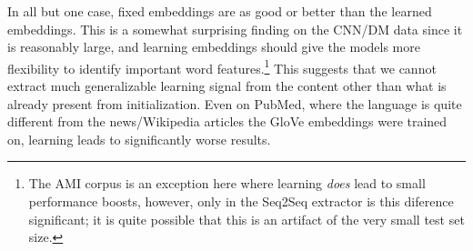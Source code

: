  In all but one case,
fixed embeddings are as good or better than the learned embeddings.
This is a somewhat surprising finding on the CNN/DM data since it is reasonably
large, and learning embeddings should give the models more
flexibility to identify important word features.\footnote{The AMI corpus is an exception here where learning \emph{does} lead to small
performance boosts, however, only in the Seq2Seq extractor is this diference 
significant; it is quite possible that this is an artifact of the very small
test set size.}
This suggests that we cannot extract much generalizable learning signal 
from the content other than what is already present from initialization. 
Even on PubMed, where the language is quite different from the news/Wikipedia
articles the GloVe embeddings were trained on, learning leads to 
significantly worse results.




